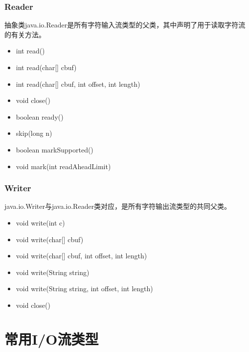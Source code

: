 \begin{frame}[fragile] %
\frametitle{Reader}

抽象类java.io.Reader是所有字符输入流类型的父类，其中声明了用于读取字符流的有关方法。
\begin{itemize}
\item int read()
\item int read(char[] cbuf)
\item int read(char[] cbuf, int offset, int length)
\end{itemize}

\begin{itemize}
\item void close()
\item boolean ready()
\item skip(long n)
\item boolean markSupported()
\item void mark(int readAheadLimit)
\end{itemize}
\end{frame}

\begin{frame}[fragile] %
\frametitle{Writer}

java.io.Writer与java.io.Reader类对应，是所有字符输出流类型的共同父类。
\begin{itemize}
\item void write(int c)
\item void write(char[] cbuf)
\item void write(char[] cbuf, int offset, int length)
\item void write(String string)
\item void write(String string, int offset, int length)
\end{itemize}
\begin{itemize}
\item void close()
\end{itemize}
\end{frame}

\section{常用I/O流类型}

